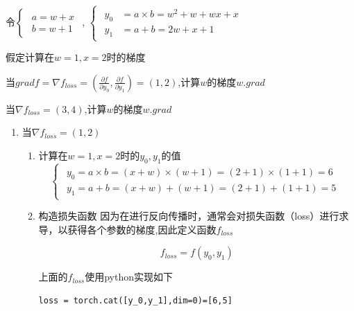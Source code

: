 \begin{example}
        \exProblem
        令$\left\{\begin{matrix}
        \begin{aligned}
        a=w+x \\
        b=w+1
        \end{aligned}
        \end{matrix}\right.$, $\left\{\begin{matrix}
        \begin{aligned}
        y_0&=a\times b = w^2+ w + wx+ x\\
        y_1&=a+b =  2w + x +1
        \end{aligned}
        \end{matrix}\right.$
        
        假定计算在$w=1, x=2$时的梯度

        当$grad f= \nabla f_{loss} = (\frac{\partial f}{\partial y_0},\frac{\partial f}{\partial y_1}) = (1,2)$,计算$w$的梯度$w.grad$

        当$\nabla f_{loss} = (3,4)$,计算$w$的梯度$w.grad$

        \exSolution
        \begin{enumerate}[label=\arabic*)]
                \item 当$\nabla f_{loss} = (1,2)$
                \begin{enumerate}[itemindent=1em,label=(\arabic*)]
                        \item 计算在$w=1, x=2$时的$y_0, y_1$的值
                        $$\left\{\begin{matrix}
                                \begin{aligned}
                                y_0=a\times b=(x+w)\times(w+1) = (2 + 1)\times(1 + 1)=6 \\
                                y_1=a+b= (x+w)+(w+1) = (2 + 1)+(1 + 1)=5 
                                \end{aligned}
                                \end{matrix}\right.
                                $$
                        \item 构造损失函数
                        因为在进行反向传播时，通常会对损失函数（loss）进行求导，以获得各个参数的梯度,因此定义函数$f_{loss}$
        
                        $$f_{loss} = f(y_0, y_1)$$
                        
                        上面的$f_{loss}$使用python实现如下
                        \begin{lstlisting}[style=pythonstyle]
                        loss = torch.cat([y_0​,y_1​],dim=0)=[6,5]
                        \end{lstlisting}
                        

\end{enumerate}
\end{enumerate}
\end{example}
